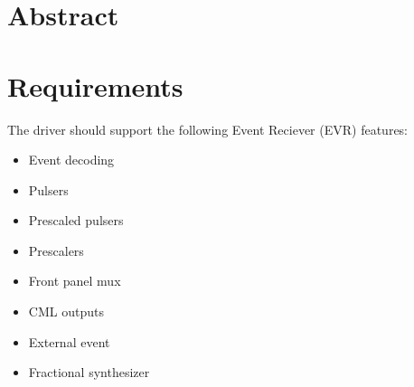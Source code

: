 \documentclass[a4paper,10pt]{article}
\begin{document}
\tableofcontents
\newpage

\setcounter{page}{1}
\setcounter{table}{0}

\justifying

\section*{Abstract}

\section{Requirements}
The driver should support the following Event Reciever (EVR) features:
\begin{itemize}
	\item Event decoding
	\item Pulsers
	\item Prescaled pulsers
	\item Prescalers
	\item Front panel mux
	\item CML outputs
	\item External event
	\item Fractional synthesizer
\end{itemize}
\end{document}
